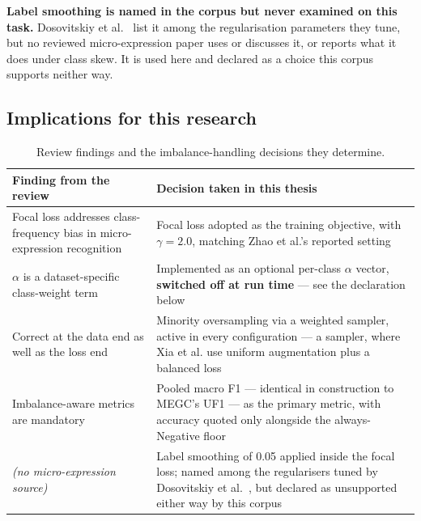 \textbf{Label smoothing is named in the corpus but never examined on this task.} Dosovitskiy et al.~\cite{dosovitskiy2021} list it among the regularisation parameters they tune, but no reviewed micro-expression paper uses or discusses it, or reports what it does under class skew. It is used here and declared as a choice this corpus supports neither way.

\subsection{Implications for this research}
\label{sec:imbalance-double-correction}

\begin{table}[htbp]
	\centering
	\footnotesize
	\begin{tabular}{@{}p{5.6cm} p{8.0cm}@{}}
		\hline
		\textbf{Finding from the review} & \textbf{Decision taken in this thesis} \\
		\hline
		Focal loss addresses class-frequency bias in micro-expression recognition~\cite{zhaoS2021} & Focal loss adopted as the training objective, with \textbf{$\gamma = 2.0$}, matching Zhao et al.'s reported setting \\
		$\alpha$ is a dataset-specific class-weight term~\cite{zhaoS2021} & Implemented as an optional per-class $\alpha$ vector, \textbf{switched off at run time} --- see the declaration below \\
		Correct at the data end as well as the loss end~\cite{xia2020a} & Minority oversampling via a weighted sampler, active in every configuration --- a sampler, where Xia et al. use uniform augmentation plus a balanced loss \\
		Imbalance-aware metrics are mandatory~\cite{see2019,liong2016} & Pooled macro F1 --- identical in construction to MEGC's UF1 --- as the primary metric, with accuracy quoted only alongside the always-Negative floor \\
		\textit{(no micro-expression source)} & Label smoothing of 0.05 applied inside the focal loss; named among the regularisers tuned by Dosovitskiy et al.~\cite{dosovitskiy2021}, but declared as unsupported either way by this corpus \\
		\hline
	\end{tabular}
	\caption[Review findings and the imbalance-handling decisions they determine]{Review findings and the imbalance-handling decisions they determine.}
	\label{tab:imbalance-decisions}
\end{table}

